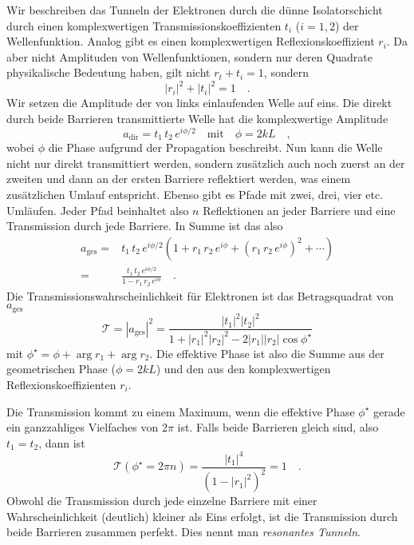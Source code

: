 Wir beschreiben das  Tunneln der Elektronen durch die dünne Isolatorschicht  durch einen komplexwertigen Transmissionskoeffizienten $t_i$ ($i=1,2$) der Wellenfunktion. Analog gibt es einen komplexwertigen Reflexionskoeffizient $r_i$. Da aber nicht Amplituden von Wellenfunktionen, sondern nur deren Quadrate physikalische Bedeutung haben, gilt nicht $r_t + t_i =1$, sondern
\begin{equation}
    |r_i|^2 + |t_i|^2 = 1 \quad .
\end{equation}
Wir setzen die Amplitude der von links einlaufenden Welle auf eins. Die direkt durch beide Barrieren transmittierte Welle hat die komplexwertige Amplitude
\begin{equation}
    a_\text{dir} = t_1 \, t_2 \, e^{i \phi/2} \quad \text{mit} \quad \phi = 2 k L \quad ,
\end{equation}
wobei $\phi$ die Phase aufgrund der Propagation beschreibt. Nun kann die Welle nicht nur direkt transmittiert werden, sondern zusätzlich auch noch zuerst an der zweiten und dann an der ersten Barriere reflektiert werden, was einem zusätzlichen Umlauf entspricht. Ebenso gibt es Pfade mit zwei, drei, vier etc. Umläufen. Jeder Pfad beinhaltet also $n$ Reflektionen an jeder Barriere und  eine Transmission durch jede Barriere. In Summe ist das also
\begin{align}
    a_\text{ges} = & t_1 \, t_2 \, e^{i \phi/2} \left( 1 + r_1 \, r_2 \,  e^{i \phi} 
    + (r_1 \, r_2 \,  e^{i \phi} )^2 + \cdots  \right) \\
     = & \frac{ t_1 \, t_2 \, e^{i \phi/2}}{1 - r_1 \, r_2 \,  e^{i \phi} } \quad .
\end{align}
Die Transmissionswahrscheinlichkeit  für Elektronen ist das Betragsquadrat von $ a_\text{ges}$
\begin{equation}
    \mathcal{T} = |  a_\text{ges} |^2 = \frac{|t_1|^2  |t_2|^2 }{1 + |r_1|^2  |r_2|^2 - 2 |r_1|  |r_2| \cos \phi^\star}
\end{equation}
mit $\phi^\star = \phi  + \arg r_1 + \arg r_2$. Die effektive Phase ist also die Summe aus der geometrischen Phase ($\phi = 2 k L $) und den aus den komplexwertigen Reflexionskoeffizienten $r_i$.

Die Transmission kommt zu einem Maximum, wenn die effektive Phase $\phi^\star$ gerade ein ganzzahliges Vielfaches von $2\pi$ ist. Falls beide Barrieren gleich  sind, also $t_1 = t_2$, dann ist 
\begin{equation}
    \mathcal{T} (\phi^\star = 2 \pi n) =\frac{|t_1|^4}{ (1- |r_1|^2)^2} = 1 \quad .
\end{equation}
Obwohl die Transmission durch jede einzelne Barriere mit einer Wahrscheinlichkeit (deutlich) kleiner als Eins erfolgt, ist die Transmission durch beide Barrieren zusammen perfekt. Dies nennt man \emph{resonantes Tunneln}.


